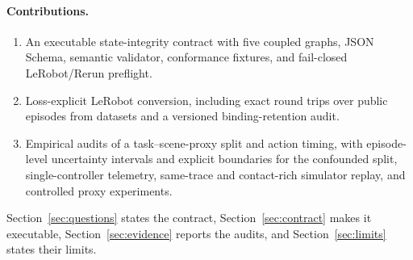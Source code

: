 \paragraph{Contributions.}
\begin{enumerate}[leftmargin=1.4em,itemsep=2pt,topsep=3pt]
  \item An executable state-integrity contract with five coupled graphs, JSON Schema, semantic
  validator, conformance fixtures, and fail-closed LeRobot/Rerun preflight.
  \item Loss-explicit LeRobot conversion, including exact round trips over
  \ExpConversionScaleEpisodeCount{} public episodes from \ExpConversionScaleDatasetCount{} datasets
  and a
  versioned binding-retention audit.
  \item Empirical audits of a task--scene-proxy split and action timing, with episode-level
  uncertainty intervals and explicit boundaries for the confounded split, single-controller
  telemetry, same-trace and contact-rich simulator replay, and controlled proxy experiments.
\end{enumerate}

Section~\ref{sec:questions} states the contract, Section~\ref{sec:contract} makes it executable,
Section~\ref{sec:evidence} reports the audits, and Section~\ref{sec:limits} states their limits.
